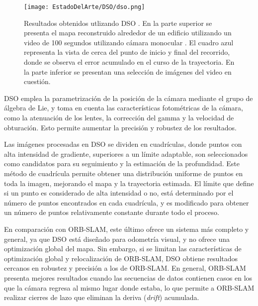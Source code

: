 \begin{figure}[H]
	\centering
	\texttt{[image: EstadoDelArte/DSO/dso.png]}
	\caption[Resultados obtenidos utilizando DSO \cite{DSO}] {Resultados obtenidos utlizando DSO \cite{DSO}. En la parte superior se presenta el mapa reconstruido alrededor de un edificio utilizando un video de 100 segundos utilizando cámara monocular . El cuadro azul representa la vista de cerca del punto de inicio y final del recorrido, donde se observa el error acumulado en el curso de la trayectoria. En la parte inferior se presentan una selección de imágenes del video en cuestión.}
	\label{fig:DSOEstimacion}
\end{figure}

DSO emplea la parametrización de la posición de la cámara mediante el grupo
de álgebra de Lie, y toma en cuenta las características fotométricas de la cámara, como la atenuación de los lentes, la corrección del gamma y la velocidad de obturación. Esto permite aumentar la precisión y robustez de los resultados.


Las imágenes procesadas en DSO se dividen en cuadrículas, donde puntos con
alta intensidad de gradiente, superiores a un límite adaptable, son seleccionados
como candidatos para su seguimiento y la estimación de la profundidad. Este
método de cuadrícula  permite obtener una distribución uniforme de puntos en
toda la imagen, mejorando el mapa y la trayectoria estimada. El límite que define
si un punto es considerado de alta intensidad o no, está determinado por el número
de puntos encontrados en cada cuadrícula, y es modificado para obtener un número
de puntos relativamente constante durante todo el proceso.

	
En comparación con ORB-SLAM, este último ofrece un sistema más completo y general, ya que DSO está diseñado para odometría visual, y no ofrece una optimización global del mapa. Sin embargo, si se limitan las características de optimización global y relocalización de ORB-SLAM,  DSO obtiene resultados cercanos en robustez y
precisión a los de ORB-SLAM. En general, ORB-SLAM presenta mejores resultados cuando las secuencias de datos contienen casos en los que la cámara regresa al mismo lugar donde estaba, lo que permite a ORB-SLAM realizar cierres de lazo que eliminan la deriva (\textit{drift}) acumulada.


